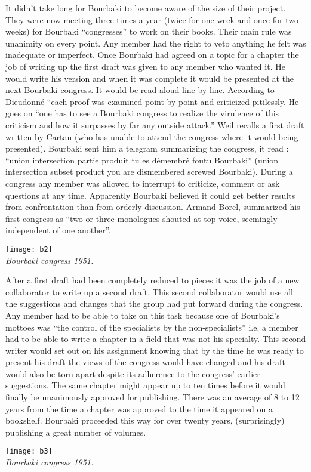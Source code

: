 \documentclass[12pt]{article}
\begin{document}
It didn't take long for Bourbaki to become aware of the size of their project. 
They were now meeting three times a year (twice for one week and once for two 
weeks) for Bourbaki ``congresses'' to work on their books. Their main rule was 
unanimity on every point. Any member had the right to veto anything he felt 
was inadequate or imperfect. Once Bourbaki had agreed on a topic for a chapter 
the job of writing up the first draft was given to any member who wanted it. 
He would write his version and when it was complete it would be presented at 
the next Bourbaki congress. It would be read aloud line by line. According 
to Dieudonn\'e ``each proof was examined point by point and criticized 
pitilessly. He goes on ``one has to see a Bourbaki congress to realize the 
virulence of this criticism and how it surpasses by far any outside attack.''
\cite{DJ} Weil recalls a first draft written by Cartan (who has unable to attend 
the congress where it would being presented). Bourbaki sent him a telegram 
summarizing the congress, it read : ``union intersection partie produit tu 
es d\'emembr\'e foutu Bourbaki'' (union intersection subset product you are 
dismembered screwed Bourbaki).\cite{WA} During a congress any member was 
allowed to interrupt to criticize, comment or ask questions at any time. 
Apparently Bourbaki believed it could get better results from confrontation 
than from orderly discussion.\cite{BA} Armand Borel, summarized his first 
congress as ``two or three monologues shouted at top voice, seemingly 
independent of one another''.\cite{BA} 
\begin{center}
\texttt{[image: b2]}\\
\footnotesize\itshape Bourbaki congress 1951.
\end{center}
After a first draft had been completely reduced to pieces it was the job of 
a new collaborator to write up a second draft. This second collaborator 
would use all the suggestions and changes that the group had put forward 
during the congress. Any member had to be able to take on this task because 
one of Bourbaki's mottoes  was ``the control of the specialists by the 
non-specialists''\cite{BA} i.e. a member had to be able to write a chapter 
in a field that was not his specialty. This second writer would set out on 
his assignment knowing that by the time he was ready to present his draft 
the views of the congress would have changed and his draft would also be 
torn apart despite its adherence to the congress' earlier suggestions. 
The same chapter might appear up to ten times before it would finally be 
unanimously approved for publishing. There was an average of 8 to 12 years 
from the time a chapter was approved to the time it appeared on a bookshelf.
\cite{DJ} Bourbaki proceeded this way for over twenty years, (surprisingly) 
publishing a great number of volumes.
\begin{center}
\texttt{[image: b3]}\\
\footnotesize\itshape Bourbaki congress 1951.
\end{center}
\end{document}
